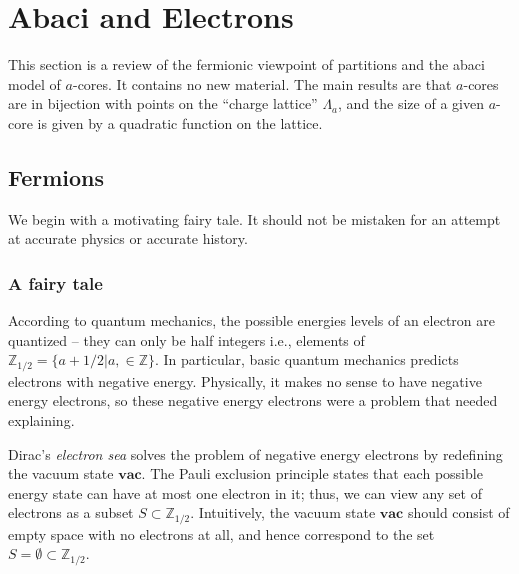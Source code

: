 \documentclass{amsart}[12pt]
\theoremstyle{definition}
\newtheorem{definition}[dummy]{Definition}
\newcommand{\Z}{\mathbb{Z}}
\newcommand{\R}{\mathbb{R}}
\newcommand{\vac}{\mathbf{vac}}
\begin{document}



\section{Abaci and Electrons} \label{sec:abacus}

This section is a review of the fermionic viewpoint of partitions and the abaci model of $a$-cores.  It contains no new material.  The main results are that $a$-cores are in bijection with points on the ``charge lattice'' $\Lambda_a$, and the size of a given $a$-core is given by a quadratic function on the lattice.



\subsection{Fermions}
 We begin with a motivating fairy tale. It should not be mistaken for an attempt at accurate physics or accurate history.


\subsubsection{A fairy tale}
According to quantum mechanics, the possible energies levels of an electron are quantized -- they can only be half integers i.e., elements of $\Z_{1/2}=\{a+1/2|a,\in\Z\}$.  In particular, basic quantum mechanics predicts electrons with negative energy.  Physically, it makes no sense to have negative energy electrons, so these negative energy electrons were a problem that needed explaining.


Dirac's \emph{electron sea} solves the problem of negative energy electrons by redefining the vacuum state $\vac$.  The Pauli exclusion principle states that each possible energy state can have at most one electron in it; thus, we can view any set of electrons as a subset $S\subset \Z_{1/2}$.  Intuitively, the vacuum state $\vac$ should consist of empty space with no electrons at all, and hence correspond to the set $S=\emptyset\subset\Z_{1/2}$.
\end{document}
